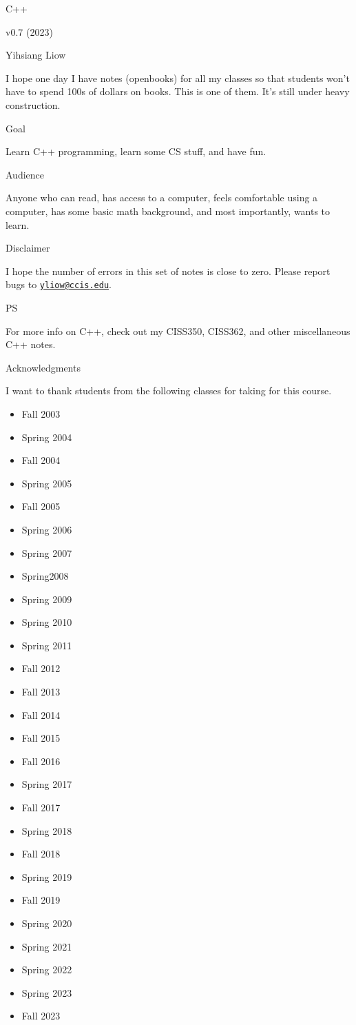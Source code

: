 \documentclass[
]{article}
\author{}
\date{}
\providecommand{\tightlist}{%
  \setlength{\itemsep}{0pt}\setlength{\parskip}{0pt}}
\begin{document}
C++

v0.7 (2023)

Yihsiang Liow

I hope one day I have notes (openbooks) for all my classes so that
students won't have to spend 100s of dollars on books. This is one of
them. It's still under heavy construction.

Goal

Learn C++ programming, learn some CS stuff, and have fun.

Audience

Anyone who can read, has access to a computer, feels comfortable using a
computer, has some basic math background, and most importantly, wants to
learn.

Disclaimer

I hope the number of errors in this set of notes is close to zero.
Please report bugs to
\href{mailto:yliow@ccis.edu}{\nolinkurl{yliow@ccis.edu}}.

PS

For more info on C++, check out my CISS350, CISS362, and other
miscellaneous C++ notes.

Acknowledgments

I want to thank students from the following classes for taking for this
course.

\begin{itemize}
\tightlist
\item
  Fall 2003
\item
  Spring 2004
\item
  Fall 2004
\item
  Spring 2005
\item
  Fall 2005
\item
  Spring 2006
\item
  Spring 2007
\item
  Spring2008
\item
  Spring 2009
\item
  Spring 2010
\item
  Spring 2011
\item
  Fall 2012
\item
  Fall 2013
\item
  Fall 2014
\item
  Fall 2015
\item
  Fall 2016
\item
  Spring 2017
\item
  Fall 2017
\item
  Spring 2018
\item
  Fall 2018
\item
  Spring 2019
\item
  Fall 2019
\item
  Spring 2020
\item
  Spring 2021
\item
  Spring 2022
\item
  Spring 2023
\item
  Fall 2023
\end{itemize}
\end{document}
